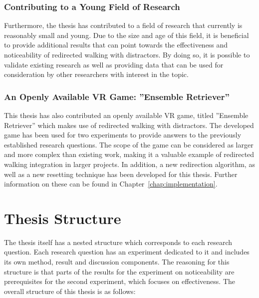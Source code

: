 \subsubsection{Contributing to a Young Field of Research}
Furthermore, the thesis has contributed to a field of research that currently is reasonably small and young. Due to the size and age of this field, it is beneficial to provide additional results that can point towards the effectiveness and noticeability of redirected walking with distractors. By doing so, it is possible to validate existing research as well as providing data that can be used for consideration by other researchers with interest in the topic. 

\subsubsection{An Openly Available VR Game: ''Ensemble Retriever''}
This thesis has also contributed an openly available VR game, titled ''Ensemble Retriever'' which makes use of redirected walking with distractors. The developed game has been used for two experiments to provide answers to the previously established research questions. The scope of the game can be considered as larger and more complex than existing work, making it a valuable example of redirected walking integration in larger projects. In addition, a new redirection algorithm, as well as a new resetting technique has been developed for this thesis. Further information on these can be found in Chapter~\ref{chap:implementation}. 

\section{Thesis Structure}
The thesis itself has a nested structure which corresponds to each research question. Each research question has an experiment dedicated to it and includes its own method, result and discussion components. The reasoning for this structure is that parts of the results for the experiment on noticeability are prerequisites for the second experiment, which focuses on effectiveness. The overall structure of this thesis is as follows:

